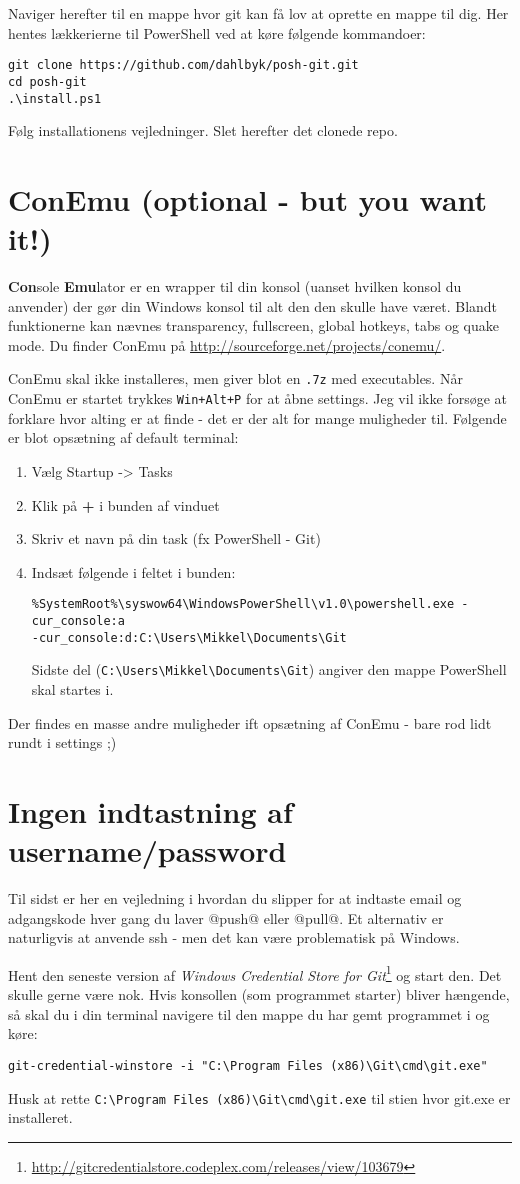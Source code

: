 Naviger herefter til en mappe hvor git kan få lov at oprette en mappe til dig.
Her hentes lækkerierne til PowerShell ved at køre følgende kommandoer:
\begin{lstlisting}
git clone https://github.com/dahlbyk/posh-git.git
cd posh-git
.\install.ps1
\end{lstlisting}
Følg installationens vejledninger.
Slet herefter det clonede repo.

\section{ConEmu (optional - but you want it!)}

\textbf{Con}sole \textbf{Emu}lator er en wrapper til din konsol (uanset hvilken konsol du anvender) der gør din Windows konsol til alt den den skulle have været.
Blandt funktionerne kan nævnes transparency, fullscreen, global hotkeys, tabs og quake mode.
Du finder ConEmu på \url{http://sourceforge.net/projects/conemu/}.

ConEmu skal ikke installeres, men giver blot en \texttt{.7z} med executables.
Når ConEmu er startet trykkes \texttt{Win+Alt+P} for at åbne settings.
Jeg vil ikke forsøge at forklare hvor alting er at finde - det er der alt for mange muligheder til.
Følgende er blot opsætning af default terminal:
\begin{enumerate}
\item Vælg Startup -> Tasks
\item Klik på \textbf{+} i bunden af vinduet
\item Skriv et navn på din task (fx PowerShell - Git)
\item Indsæt følgende i feltet i bunden:
\begin{lstlisting}
%SystemRoot%\syswow64\WindowsPowerShell\v1.0\powershell.exe -cur_console:a
-cur_console:d:C:\Users\Mikkel\Documents\Git
\end{lstlisting}
Sidste del (\lstinline!C:\Users\Mikkel\Documents\Git!) angiver den mappe PowerShell skal startes i.
\end{enumerate}

Der findes en masse andre muligheder ift opsætning af ConEmu - bare rod lidt rundt i settings ;)

\section{Ingen indtastning af username/password}
Til sidst er her en vejledning i hvordan du slipper for at indtaste email og adgangskode hver gang du laver @push@ eller @pull@.
Et alternativ er naturligvis at anvende ssh - men det kan være problematisk på Windows.

Hent den seneste version af \textit{Windows Credential Store for Git}\footnote{\url{http://gitcredentialstore.codeplex.com/releases/view/103679}} og start den.
Det skulle gerne være nok.
Hvis konsollen (som programmet starter) bliver hængende, så skal du i din terminal navigere til den mappe du har gemt programmet i og køre:
\begin{lstlisting}
git-credential-winstore -i "C:\Program Files (x86)\Git\cmd\git.exe"
\end{lstlisting}
Husk at rette \lstinline!C:\Program Files (x86)\Git\cmd\git.exe! til stien hvor git.exe er installeret.